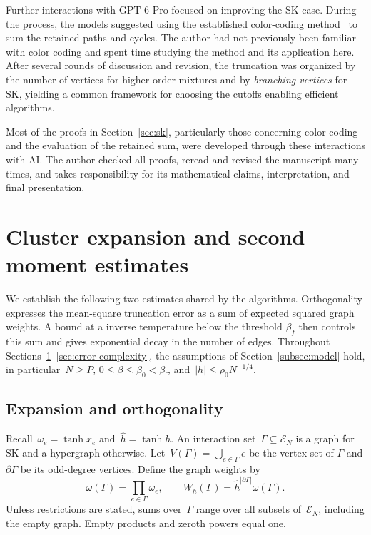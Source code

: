 \documentclass[letterpaper,11pt,reqno]{amsart}
\renewcommand{\leq}{\leqslant}
\renewcommand{\geq}{\geqslant}
\newcommand{\hh}{\hat{h}}
\begin{document}
Further interactions with  GPT-6 Pro focused on improving the SK case. During the process, the models suggested using the established color-coding method~\cite{AYZ95} to sum the retained paths and cycles. The author had not previously been familiar with color coding and spent time studying the method and its application here. After several rounds of discussion and revision, the truncation was organized by the number of vertices for higher-order mixtures and by \emph{branching vertices} for SK, yielding a common framework for choosing the cutoffs enabling efficient algorithms.

Most of the proofs in Section~\ref{sec:sk}, particularly those concerning color coding and the evaluation of the retained sum, were developed through these interactions with AI. The author checked all proofs, reread and revised the manuscript many times, and takes responsibility for its mathematical claims, interpretation, and final presentation. 

\section{Cluster expansion and second moment estimates}\label{sec:cluster-expansion}

We establish the following two estimates shared by the algorithms. Orthogonality expresses the mean-square truncation error as a sum of expected squared graph weights. A bound at a inverse temperature below the threshold $\beta_f$ then controls this sum and gives exponential decay in the number of edges. Throughout Sections~\ref{sec:cluster-expansion}--\ref{sec:error-complexity}, the assumptions of Section~\ref{subsec:model} hold, in particular~$N\geq P$, $0\leq\beta\leq\beta_0<\beta_{\mathrm f}$, and~$|h|\leq\rho_0N^{-1/4}$.

\subsection{Expansion and orthogonality}\label{subsec:expansion}

Recall~$\omega_e=\tanh x_e$ and~$\hh=\tanh h$. An interaction set~$\Gamma\subseteq\mathcal E_N$ is a graph for SK and a hypergraph otherwise. Let~$V(\Gamma)=\bigcup_{e\in\Gamma}e$ be the vertex set of $\Gamma$ and $\partial\Gamma$ be its odd-degree vertices. Define the graph weights by
\begin{equation*}
\omega(\Gamma)=\prod_{e\in\Gamma}\omega_e,
\qquad W_h(\Gamma)=\hh^{|\partial\Gamma|}\omega(\Gamma).
\end{equation*}
Unless restrictions are stated, sums over~$\Gamma$ range over all subsets of~$\mathcal E_N$, including the empty graph. Empty products and zeroth powers equal one.
\end{document}
